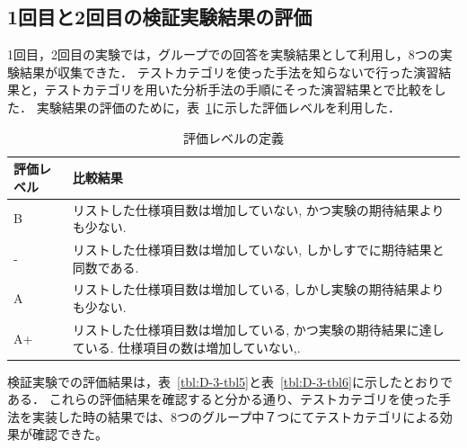 \documentclass[a4paper,12pt]{jreport}
\begin{document}
\subsection{1回目と2回目の検証実験結果の評価}
1回目，2回目の実験では，グループでの回答を実験結果として利用し，8つの実験結果が収集できた．
テストカテゴリを使った手法を知らないで行った演習結果と，テストカテゴリを用いた分析手法の手順にそった演習結果とで比較をした．
実験結果の評価のために，表~\ref{tbl:D-3-tbl4}に示した評価レベルを利用した． 
\begin{table}[htbp]
  \centering
  \caption{評価レベルの定義}
    \begin{tabular}{|l|p{14.855em}|}
       \hline
    評価レベル & \multicolumn{1}{l|}{比較結果} \\
        \hline
     B    & リストした仕様項目数は増加していない, かつ実験の期待結果よりも少ない.  \\
        \hline
    -     & リストした仕様項目数は増加していない, しかしすでに期待結果と同数である.  \\
        \hline
    A     & リストした仕様項目数は増加している, しかし実験の期待結果よりも少ない.   \\
       \hline
    A+    & リストした仕様項目数は増加している, かつ実験の期待結果に達している. 仕様項目の数は増加していない,.  \\
        \hline
    \end{tabular}%
  \label{tbl:D-3-tbl4}%
\end{table}%

検証実験での評価結果は，表~\ref{tbl:D-3-tbl5}と表~\ref{tbl:D-3-tbl6}に示したとおりである．
これらの評価結果を確認すると分かる通り、テストカテゴリを使った手法を実装した時の結果では、8つのグループ中７つにてテストカテゴリによる効果が確認できた。
\end{document}

